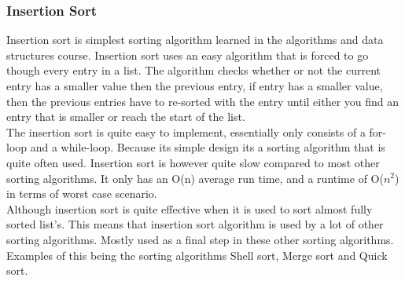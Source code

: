 \subsubsection{Insertion Sort}
Insertion sort is simplest sorting algorithm learned in the algorithms and data structures course. Insertion sort uses an easy algorithm that is forced to go though every entry in a list. The algorithm checks whether or not the current entry has a smaller value then the previous entry, if entry has a smaller value, then the previous entries have to re-sorted with the entry until either you find an entry that is smaller or reach the start of the list. 
\\[11pt]
The insertion sort is quite easy to implement, essentially only consists of a for-loop and a while-loop. Because its simple design its a sorting algorithm that is quite often used. Insertion sort is however quite slow compared to most other sorting algorithms. It only has an O(n) average run time, and a runtime of O($n^2$) in terms of worst case scenario.
\\[11pt]
Although insertion sort is quite effective when it is used to sort almost fully sorted list's. This means that insertion sort algorithm is used by a lot of other sorting algorithms. Mostly used as a final step in these other sorting algorithms. Examples of this being the sorting algorithms Shell sort, Merge sort and Quick sort.	%